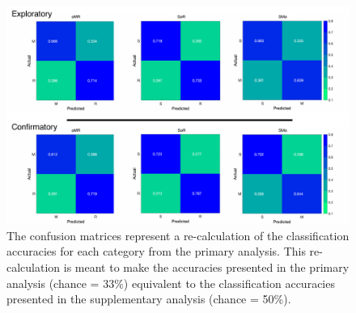 \documentclass[
  english,
  man,floatsintext]{apa6}
\begin{document}
\begin{appendix}
\begin{figure}
\centering
\includegraphics{supplementary_analysis/recalc_orig_accs/confusion_matrices/recalc_conf_matrices.pdf}
\caption{\label{fig:recalc-conf-matrices}The confusion matrices represent a
re-calculation of the classification accuracies for each category from
the primary analysis. This re-calculation is meant to make the
accuracies presented in the primary analysis (chance = 33\%) equivalent
to the classification accuracies presented in the supplementary analysis
(chance = 50\%).}
\end{figure}
\end{appendix}
\end{document}
